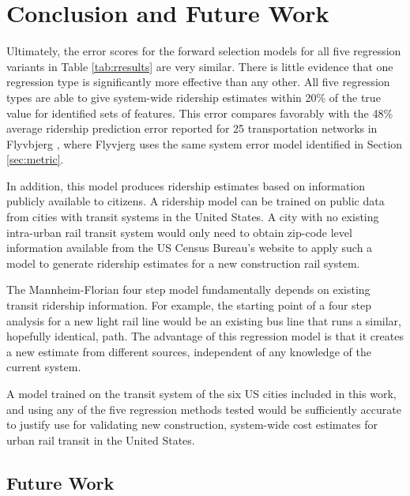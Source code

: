 \documentclass[11pt]{article}
\begin{document}
\section{Conclusion and Future Work}\label{sec:acc}

Ultimately, the error scores for the forward selection models for all five regression variants in Table \ref{tab:rresults} are very similar. There is little evidence that one regression type is significantly more effective than any other. All five regression types are able to give system-wide ridership estimates within 20\% of the true value for identified sets of features. This error compares favorably with the 48\% average ridership prediction  error reported for 25 transportation networks in Flyvbjerg \cite{Flyvbjerg2006}, where Flyvjerg uses the same system error model identified in Section \ref{sec:metric}. 

In addition, this model produces ridership estimates based on information publicly available to citizens. A ridership model can be trained on public data from cities with transit systems in the United States. A city with no existing intra-urban rail transit system would only need to obtain zip-code level information available from the US Census Bureau's website to apply such a model to generate ridership estimates for a new construction rail system. 

The Mannheim-Florian four step model fundamentally depends on existing transit ridership information. For example, the starting point of a four step analysis for a new light rail line would be an existing bus line that runs a similar, hopefully identical, path. The advantage of this regression model is that it creates a new estimate from different sources, independent of any knowledge of the current system.

A model trained on the transit system of the six US cities included in this work, and using any of the five regression methods tested would be sufficiently accurate to justify use for validating new construction, system-wide cost estimates for urban rail transit in the United States. 

\subsection{Future Work}
\end{document}
